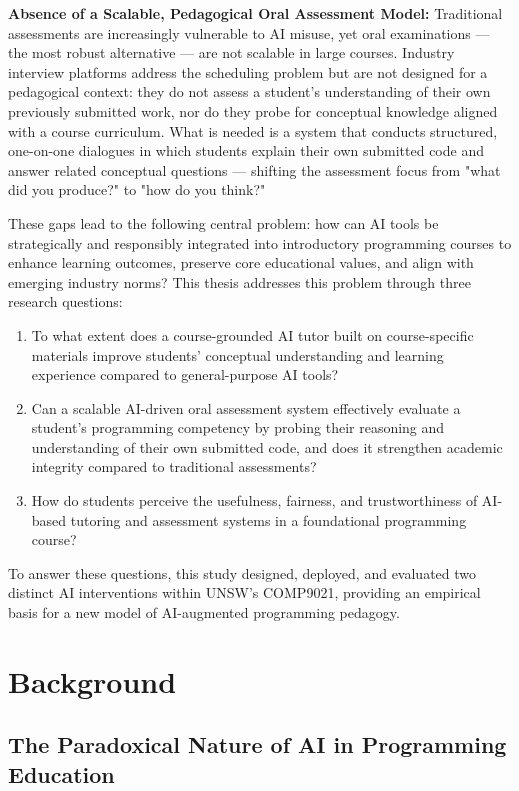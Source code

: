 \textbf{Absence of a Scalable, Pedagogical Oral Assessment Model:} Traditional assessments are increasingly vulnerable to AI misuse, yet oral examinations — the most robust alternative — are not scalable in large courses. Industry interview platforms address the scheduling problem but are not designed for a pedagogical context: they do not assess a student's understanding of their own previously submitted work, nor do they probe for conceptual knowledge aligned with a course curriculum. What is needed is a system that conducts structured, one-on-one dialogues in which students explain their own submitted code and answer related conceptual questions — shifting the assessment focus from "what did you produce?" to "how do you think?"

These gaps lead to the following central problem: how can AI tools be strategically and responsibly integrated into introductory programming courses to enhance learning outcomes, preserve core educational values, and align with emerging industry norms? This thesis addresses this problem through three research questions:

\begin{enumerate}
    \item To what extent does a course-grounded AI tutor built on course-specific materials improve students' conceptual understanding and learning experience compared to general-purpose AI tools?
    \item Can a scalable AI-driven oral assessment system effectively evaluate a student's programming competency by probing their reasoning and understanding of their own submitted code, and does it strengthen academic integrity compared to traditional assessments?
    \item How do students perceive the usefulness, fairness, and trustworthiness of AI-based tutoring and assessment systems in a foundational programming course?
\end{enumerate}

To answer these questions, this study designed, deployed, and evaluated two distinct AI interventions within UNSW's COMP9021, providing an empirical basis for a new model of AI-augmented programming pedagogy.

\chapter{Background}\label{ch:literature_review}

\section{The Paradoxical Nature of AI in Programming Education}

